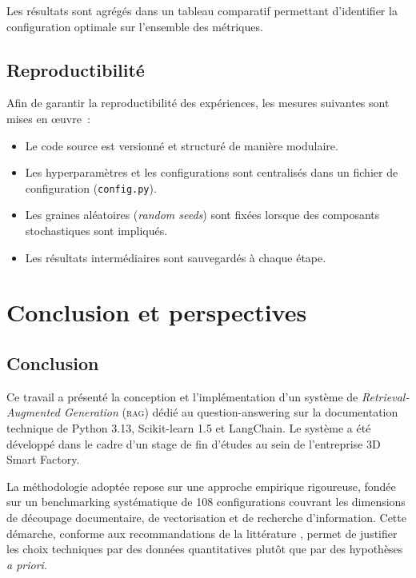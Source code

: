 \documentclass[12pt,a4paper,oneside]{report}
\newcommand{\rag}{\textsc{rag}}
\begin{document}
Les résultats sont agrégés dans un tableau comparatif permettant d'identifier la configuration optimale sur l'ensemble des métriques.

\section{Reproductibilité}

Afin de garantir la reproductibilité des expériences, les mesures suivantes sont mises en \oe{}uvre~:
\begin{itemize}[nosep]
  \item Le code source est versionné et structuré de manière modulaire.
  \item Les hyperparamètres et les configurations sont centralisés dans un fichier de configuration (\texttt{config.py}).
  \item Les graines aléatoires (\textit{random seeds}) sont fixées lorsque des composants stochastiques sont impliqués.
  \item Les résultats intermédiaires sont sauvegardés à chaque étape.
\end{itemize}


\chapter{Conclusion et perspectives}
\label{chap:conclusion}

\section{Conclusion}

Ce travail a présenté la conception et l'implémentation d'un système de \textit{Retrieval-Augmented Generation} (\rag{}) dédié au question-answering sur la documentation technique de Python 3.13, Scikit-learn 1.5 et LangChain. Le système a été développé dans le cadre d'un stage de fin d'études au sein de l'entreprise 3D Smart Factory.

La méthodologie adoptée repose sur une approche empirique rigoureuse, fondée sur un benchmarking systématique de 108 configurations couvrant les dimensions de découpage documentaire, de vectorisation et de recherche d'information. Cette démarche, conforme aux recommandations de la littérature \citep{gao2024}, permet de justifier les choix techniques par des données quantitatives plutôt que par des hypothèses \textit{a priori}.
\end{document}
